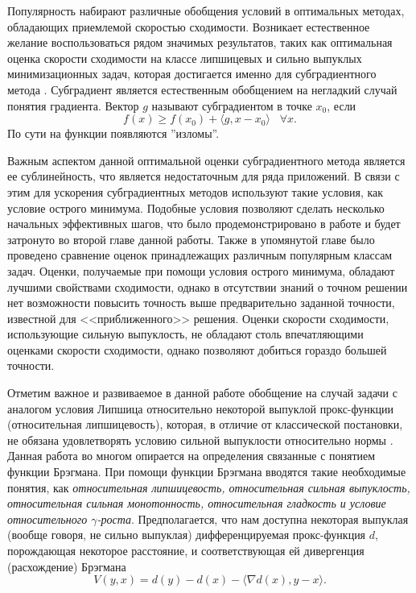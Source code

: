 Популярность набирают различные обобщения условий в оптимальных методах, обладающих приемлемой скоростью сходимости. Возникает естественное желание воспользоваться рядом значимых результатов, таких как оптимальная оценка скорости сходимости на классе липшицевых и сильно выпуклых минимизационных задач, которая достигается именно для субградиентного метода \cite{Bach_2012}. Субградиент является естественным обобщением на негладкий случай понятия градиента. Вектор $g$ называют субградиентом в точке $x_0$, если
$$
    f(x) \geq f(x_0) + \langle g, x - x_0 \rangle \;\;\; \forall x.
$$
По сути на функции появляются ''изломы''.

Важным аспектом данной оптимальной оценки субградиентного метода является ее сублинейность, что является недостаточным для ряда приложений. В связи с этим для ускорения субградиентных методов используют такие условия, как условие острого минимума. Подобные условия позволяют сделать несколько начальных эффективных шагов, что было продемонстрировано в работе \cite{sharp22} и будет затронуто во второй главе данной работы. Также в упомянутой главе было проведено сравнение оценок принадлежащих различным популярным классам задач. Оценки, получаемые при помощи условия острого минимума, обладают лучшими свойствами сходимости, однако в отсутствии знаний о точном решении нет возможности повысить точность выше предварительно заданной точности, известной для <<приближенного>> решения. Оценки скорости сходимости, использующие сильную выпуклость, не обладают столь впечатляющими оценками скорости сходимости, однако позволяют добиться гораздо большей точности. 

Отметим важное и развиваемое в данной работе обобщение на случай задачи с аналогом условия Липшица относительно некоторой выпуклой прокс-функции (относительная липшицевость), которая, в отличие от классической постановки, не обязана удовлетворять условию сильной выпуклости относительно нормы \cite{AdaMirr_2021,Lu_2018,Zhou_NIPS_2020}. Данная работа во многом опирается на определения связанные с понятием функции Брэгмана. При помощи функции Брэгмана вводятся такие необходимые понятия, как \textit{относительная липшицевость, относительная сильная выпуклость, относительная сильная монотонность, относительная гладкость и условие относительного $\gamma$-роста}. Предполагается, что нам доступна некоторая выпуклая (вообще говоря, не сильно выпуклая) дифференцируемая прокс-функция $d$, порождающая некоторое расстояние, и соответствующая ей дивергенция (расхождение) Брэгмана \cite{Bauschke}
\[
    V(y, x) = d(y) - d(x) - \langle \nabla d(x), y - x \rangle.
\]

